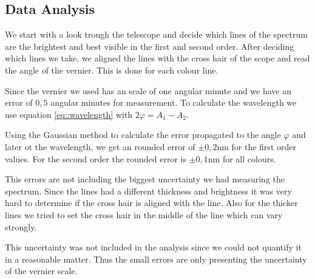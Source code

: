\subsection{Data Analysis}

We start with a look trough the telescope and decide which lines of the spectrum are the brightest and best visible in the first and second order.
After deciding which lines we take, we aligned the lines with the cross hair of the scope and read the angle of the vernier.
This is done for each colour line.


Since the vernier we used has an scale of one angular minute and we have an error of $0,5$ angular minutes for measurement.
To calculate the wavelength we use equation \ref{eq::wavelength} with $2\varphi = A_1-A_2$. 


Using the Gaussian method to calculate the error propagated to the angle $\varphi$ and later ot the wavelength, we get an rounded error of $\pm0,2$\si{\nano\m} for the first order values. 
For the second order the rounded error is $\pm0,1$\si{\nano\m} for all colours.

This errors are not including the biggest uncertainty we had measuring the spectrum. 
Since the lines had a different thickness and brightness it was very hard to determine if the cross hair is aligned with the line.
Also for the thicker lines we tried to set the cross hair in the middle of the line which can vary strongly.

This uncertainty was not included in the analysis since we could not quantify it in a reasonable matter. Thus the small errors are only presenting the uncertainty of the vernier scale.

 